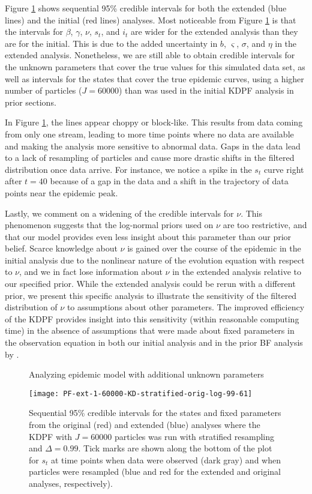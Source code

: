 Figure \ref{fig:epid:ext} shows sequential 95\% credible intervals for both the extended (blue lines) and the initial (red lines) analyses. Most noticeable from Figure \ref{fig:epid:ext} is that the intervals for $\beta$, $\gamma$, $\nu$, $s_t$, and $i_t$ are wider for the extended analysis than they are for the initial. This is due to the added uncertainty in $b$, $\varsigma$, $\sigma$, and $\eta$ in the extended analysis. Nonetheless, we are still able to obtain credible intervals for the unknown parameters that cover the true values for this simulated data set, as well as intervals for the states that cover the true epidemic curves, using a higher number of particles ($J = 60000$) than was used in the initial KDPF analysis in prior sections.

In Figure \ref{fig:epid:ext}, the lines appear choppy or block-like. This results from data coming from only one stream, leading to more time points where no data are available and making the analysis more sensitive to abnormal data. Gaps in the data lead to a lack of resampling of particles and cause more drastic shifts in the filtered distribution once data arrive. For instance, we notice a spike in the $s_t$ curve right after $t = 40$ because of a gap in the data and a shift in the trajectory of data points near the epidemic peak.

Lastly, we comment on a widening of the credible intervals for $\nu$. This phenomenon suggests that the log-normal priors used on $\nu$ are too restrictive, and that our model provides even less insight about this parameter than our prior belief. Scarce knowledge about $\nu$ is gained over the course of the epidemic in the initial analysis due to the nonlinear nature of the evolution equation with respect to $\nu$, and we in fact lose information about $\nu$ in the extended analysis relative to our specified prior. While the extended analysis could be rerun with a different prior, we present this specific analysis to illustrate the sensitivity of the filtered distribution of $\nu$ to assumptions about other parameters. The improved efficiency of the KDPF provides insight into this sensitivity (within reasonable computing time) in the absence of assumptions that were made about fixed parameters in the observation equation in both our initial analysis and in the prior BF analysis by \citet{skvortsov2012monitoring}.

\begin{figure}
\ssp
\centering
\caption{Analyzing epidemic model with additional unknown parameters} \label{fig:epid:ext}
\texttt{[image: PF-ext-1-60000-KD-stratified-orig-log-99-61]}
\caption{Sequential 95\% credible intervals for the states and fixed parameters from the original (red) and extended (blue) analyses where the KDPF with $J = 60000$ particles was run with stratified resampling and $\Delta = 0.99$. Tick marks are shown along the bottom of the plot for $s_t$ at time points when data were observed (dark gray) and when particles were resampled (blue and red for the extended and original analyses, respectively).}
\end{figure}

